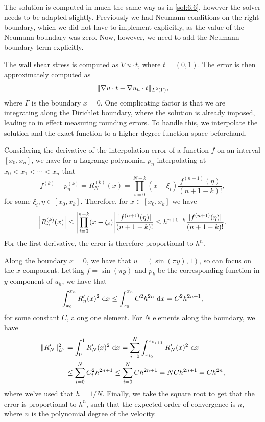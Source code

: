 \begin{solution}{6.7}
    The solution is computed in much the same way as in \cref{sol:6.6}, however the solver needs to be adapted slightly.
    Previously we had Neumann conditions on the right boundary, which we did not have to implement explicitly, as the value of the Neumann boundary was zero.
    Now, however, we need to add the Neumann boundary term explicitly.

    The wall shear stress is computed as $\nabla u \cdot t$, where $t = (0, 1)$.
    The error is then approximately computed as
    \begin{equation*}
        \lVert\nabla u \cdot t - \nabla u_h \cdot t\rVert_{L^2(\Gamma)},
    \end{equation*}
    where $\Gamma$ is the boundary $x = 0$.
    One complicating factor is that we are integrating along the Dirichlet boundary, where the solution is already imposed, leading to in effect measuring rounding errors.
    To handle this, we interpolate the solution and the exact function to a higher degree function space beforehand.

    Considering the derivative of the interpolation error of a function $f$ on an interval $[x_0, x_n]$, we have for a Lagrange polynomial $p_n$ interpolating at $x_0 < x_1 < \cdots < x_n$ that
    \begin{equation*}
        f^{(k)} - p_n^{(k)} = R_N^{(k)}(x) = \prod_{i = 0}^{N - k} (x - \xi_i) \frac{f^{(n+1)}(\eta)}{(n + 1 - k)!},
    \end{equation*}
    for some $\xi_i, \eta \in [x_0, x_k]$.
    Therefore, for $x \in [x_0, x_k]$ we have
    \begin{equation*}
        \abs*{R_n^{(k)}(x)} \leq \abs*{\prod_{i = 0}^{n - k} (x - \xi_i)} \frac{\abs{f^{(n+1)}(\eta)}}{(n + 1 - k)!} \leq h^{n + 1 - k} \frac{\abs{f^{(n+1)}(\eta)}}{(n + 1 - k)!}.
    \end{equation*}
    For the first derivative, the error is therefore proportional to $h^{n}$.

    Along the boundary $x = 0$, we have that $u = (\sin(\pi y), 1)$, so can focus on the $x$-component.
    Letting $f = \sin(\pi y)$ and $p_k$ be the corresponding function in $y$ component of $u_h$, we have that
    \begin{equation*}
        \int_{x_0}^{x_n} R_n'(x)^2 \, \mathop{}\!\mathrm{d} x \leq \int_{x_0}^{x_n} C^2 h^{2n} \, \mathop{}\!\mathrm{d} x = C^2 h^{2n + 1},
    \end{equation*}
    for some constant $C$, along one element.
    For $N$ elements along the boundary, we have
    \begin{align*}
        \lVert R_N'\rVert_{L^2}^2
        &= \int_{0}^{1} R_N'(x)^2 \, \mathop{}\!\mathrm{d} x
        = \sum_{i = 0}^N \int_{x_{i_0}}^{x_{n_{i+1}}} R_N'(x)^2 \, \mathop{}\!\mathrm{d} x \\
        &\leq \sum_{i = 0}^{N} C_i^2 h^{2n + 1}
        \leq \sum_{i = 0}^{N} C h^{2n + 1}
        = N C h^{2n + 1} = C h^{2n},
    \end{align*}
    where we've used that $h = 1/N$.
    Finally, we take the square root to get that the error is proportional to $h^n$, such that the expected order of convergence is $n$, where $n$ is the polynomial degree of the velocity.


\end{solution}
